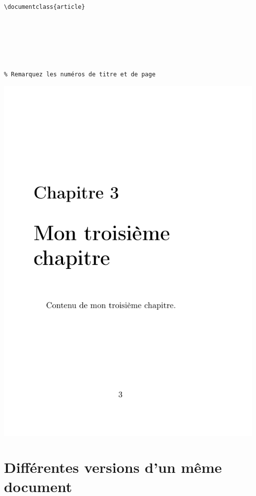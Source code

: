 \begin{minipage}{.55\linewidth}
	\begin{verbatim}
\documentclass{article}






% Remarquez les numéros de titre et de page
	\end{verbatim}
\end{minipage}
\hfill
\begin{boxedminipage}{.38\linewidth}
	\centering
	\includegraphics[scale=.5]{images/choix_extensions_exemple_principal}
\end{boxedminipage}





\section[Versions d'un document]{Différentes versions d'un même document}

